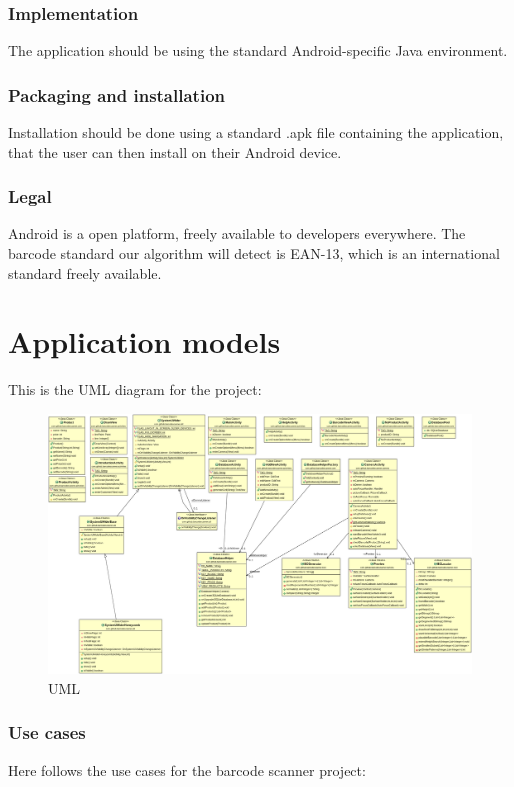 \documentclass{report}
\begin{document}
\subsection{Implementation}
The application should be using the standard Android-specific Java environment.

\subsection{Packaging and installation}
Installation should be done using a standard .apk file containing the application, that the user can then install on their Android device.

\subsection{Legal}
Android is a open platform, freely available to developers everywhere. The barcode standard our algorithm will detect is EAN-13, which is an international standard freely available.

\pagebreak

\chapter{Application models}
This is the UML diagram for the project:
\begin{figure}[H]
		\centering
		\includegraphics[width=\textwidth]{uml.png}
		\caption{UML}
		\label{fig:UML}
\end{figure}



\subsection{Use cases}
Here follows the use cases for the barcode scanner project: 
\end{document}
